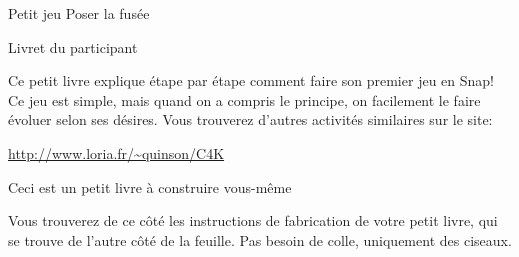 \documentclass[a4paper,12pt]{article}
\begin{document}
\begin{center}
  {\Huge Petit jeu \og Poser la fusée \fg{}}

  \bigskip
  {\Large Livret du participant}
  \vspace{-\baselineskip}
\end{center}

\large

Ce petit livre explique étape par étape comment faire son premier jeu en Snap!
Ce jeu est simple, mais quand on a compris le principe, on facilement le faire
évoluer selon ses désires. Vous trouverez d'autres activités similaires sur le
site:

\centerline{\color{blue}\url{http://www.loria.fr/~quinson/C4K}}

\bigskip\bigskip
\bigskip\bigskip

\centerline{\Large Ceci est un petit livre à construire vous-même}


Vous trouverez de ce côté les instructions de fabrication de votre
petit livre, qui se trouve de l'autre côté de la feuille. Pas besoin
de colle, uniquement des ciseaux.

\bigskip\bigskip
\end{document}
